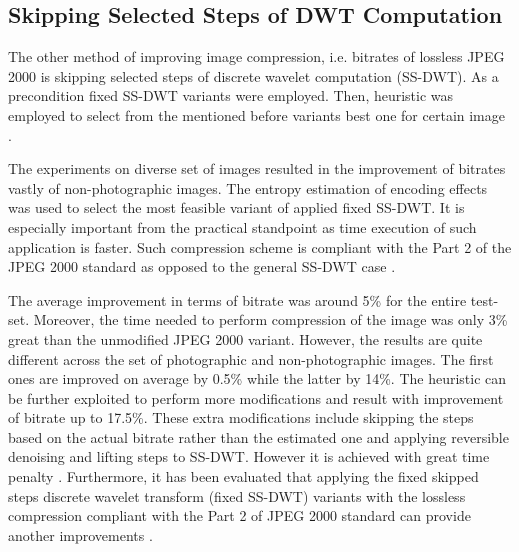 \subsection{Skipping Selected Steps of DWT Computation}

The other method of improving image compression, i.e. bitrates of lossless JPEG 2000 is skipping
selected steps of discrete wavelet computation (SS-DWT). As a precondition fixed SS-DWT variants
were employed. Then, heuristic was employed to select from the mentioned before variants best
one for certain image \cite{skipping_dwt}.

The experiments on diverse set of images resulted in the improvement of bitrates vastly of
non-photographic images. The entropy estimation of encoding effects was used to select the most
feasible variant of applied fixed SS-DWT. It is especially important from the practical standpoint
as time execution of such application is faster. Such compression scheme is compliant with the Part 2
of the JPEG 2000 standard as opposed to the general SS-DWT case \cite{skipping_dwt}.

The average improvement in terms of bitrate was around 5\% for the entire test-set. Moreover,
the time needed to perform compression of the image was only 3\% great than the unmodified JPEG 2000
variant. However, the results are quite different across the set of photographic and non-photographic
images. The first ones are improved on average by 0.5\% while the latter by 14\%. The heuristic can
be further exploited to perform more modifications and result with improvement of bitrate up to 17.5\%.
These extra modifications include skipping the steps based on the actual bitrate rather than the
estimated one and applying reversible denoising and lifting steps to SS-DWT. However it is achieved with
great time penalty \cite{skipping_dwt}.
Furthermore, it has been evaluated that applying the fixed skipped steps discrete wavelet
transform (fixed SS-DWT) variants with the lossless compression compliant with the Part 2
of JPEG 2000 standard can provide another improvements \cite{practical_dwt}.
